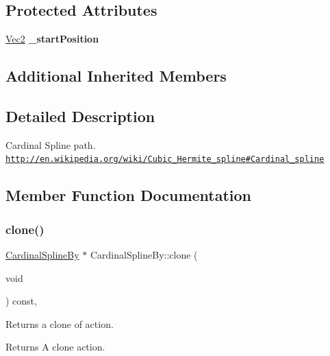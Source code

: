 \subsection*{Protected Attributes}
\begin{DoxyCompactItemize}
\item 
\mbox{\label{classCardinalSplineBy_a889248d73fbfc3a50874b93f9ac10063}} 
\hyperlink{classVec2}{Vec2} {\bfseries \+\_\+start\+Position}
\end{DoxyCompactItemize}
\subsection*{Additional Inherited Members}


\subsection{Detailed Description}
Cardinal Spline path. \href{http://en.wikipedia.org/wiki/Cubic_Hermite_spline#Cardinal_spline}{\tt http\+://en.\+wikipedia.\+org/wiki/\+Cubic\+\_\+\+Hermite\+\_\+spline\#\+Cardinal\+\_\+spline} 

\subsection{Member Function Documentation}
\mbox{\label{classCardinalSplineBy_a35b00381b2823644533fd485817b147e}} 
\subsubsection{\texorpdfstring{clone()}{clone()}\hspace{0.1cm}{\footnotesize\ttfamily [1/2]}}
{\footnotesize\ttfamily \hyperlink{classCardinalSplineBy}{Cardinal\+Spline\+By} $\ast$ Cardinal\+Spline\+By\+::clone (\begin{DoxyParamCaption}\item[{void}]{ }\end{DoxyParamCaption}) const\hspace{0.3cm}{\ttfamily [override]}, {\ttfamily [virtual]}}

Returns a clone of action.

\begin{DoxyReturn}{Returns}
A clone action. 
\end{DoxyReturn}


